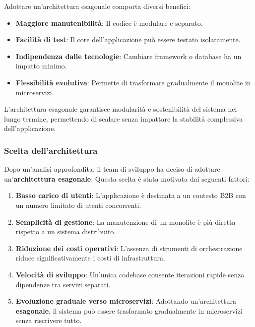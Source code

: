 Adottare un'architettura esagonale comporta diversi benefici:
\begin{itemize}
    \item \textbf{Maggiore manutenibilità}: Il codice è modulare e separato.
    \item \textbf{Facilità di test}: Il core dell’applicazione può essere testato isolatamente.
    \item \textbf{Indipendenza dalle tecnologie}: Cambiare framework o database ha un impatto minimo.
    \item \textbf{Flessibilità evolutiva}: Permette di trasformare gradualmente il monolite in microservizi.
\end{itemize}

L’architettura esagonale garantisce modularità e sostenibilità del sistema nel lungo termine, permettendo di scalare senza impattare la stabilità complessiva dell’applicazione.

\subsubsection{Scelta dell'architettura}
Dopo un’analisi approfondita, il team di sviluppo ha deciso di adottare un’\textbf{architettura esagonale}. Questa scelta è stata motivata dai seguenti fattori:
\begin{enumerate}
    \item \textbf{Basso carico di utenti}: L’applicazione è destinata a un contesto B2B con un numero limitato di utenti concorrenti.
    \item \textbf{Semplicità di gestione}: La manutenzione di un monolite è più diretta rispetto a un sistema distribuito.
    \item \textbf{Riduzione dei costi operativi}: L’assenza di strumenti di orchestrazione riduce significativamente i costi di infrastruttura.
    \item \textbf{Velocità di sviluppo}: Un’unica codebase consente iterazioni rapide senza dipendenze tra servizi separati.
    \item \textbf{Evoluzione graduale verso microservizi}: Adottando un’architettura \textbf{esagonale}, il sistema può essere trasformato gradualmente in microservizi senza riscrivere tutto.
\end{enumerate}


